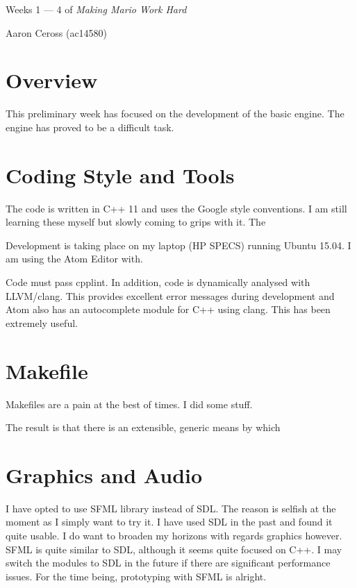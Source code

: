 \documentclass[11pt, a4paper, oneside]{article} %
\begin{document}
\begin{center}\huge Weeks 1 --- 4 of \textit{Making Mario Work Hard}
\par \Large Aaron Ceross (ac14580)
\end{center}


\section{Overview}
This preliminary week has focused on the development of the basic engine. The
engine has proved to be a difficult task.

\section{Coding Style and Tools}

The code is written in C++ 11 and uses the Google style conventions. I am still
learning these myself but slowly coming to grips with it. The

\par

Development is taking place on my laptop (HP SPECS) running Ubuntu 15.04. I am
using the Atom Editor with.

Code must pass cpplint. In addition, code is dynamically analysed with
LLVM/clang. This provides excellent error messages during development and Atom
also has an autocomplete module for C++ using clang. This has been extremely
useful.

\section{Makefile}

Makefiles are a pain at the best of times. I did some stuff.

The result is that there is an extensible, generic means by which

\section{Graphics and Audio}

I have opted to use SFML library instead of SDL. The reason is selfish at the
moment as I simply want to try it. I have used SDL in the past and found it
quite usable. I do want to broaden my horizons with regards graphics however.
\tabularnewline
SFML is quite similar to SDL, although it seems quite focused on C++. I may
switch the modules to SDL in the future if there are significant performance
issues. For the time being, prototyping with SFML is alright.
\end{document}
